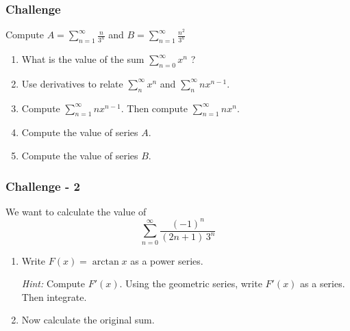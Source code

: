 \documentclass[14pt]{beamer}
\begin{document}
	\begin{frame}[t]
		\frametitle{Challenge}

		Compute \quad $\displaystyle A = \sum_{n=1}^{\infty}\frac{n}{3^{n}}$ \quad
		and \quad $\displaystyle B = \sum_{n=1}^{\infty}\frac{n^{2}}{3^{n}}$

		\hrulefill

		\begin{enumerate}
			\item What is the value of the sum $\displaystyle \sum_{n=0}^{\infty}x^{n}$
				?

			\item Use derivatives to relate $\displaystyle \sum_{n}^{\infty}x^{n}$ and
				$\displaystyle \sum_{n}^{\infty}nx^{n-1}$.

			\item Compute $\displaystyle \sum_{n=1}^{\infty}n x^{n-1}$. \quad Then
				compute $\displaystyle \sum_{n=1}^{\infty}n x^{n}$.

			\item Compute the value of series $A$.

			\item Compute the value of series $B$.
		\end{enumerate}
	\end{frame}

	\begin{frame}[t]
		\frametitle{Challenge - 2}

		We want to calculate the value of
		\[
			\sum_{n=0}^{\infty}\frac{(-1)^{n}}{(2n+1) \, 3^{n}}
		\]

		\hrulefill

		\begin{enumerate}
			\item Write $\displaystyle F(x) = \arctan x$ as a power series.
				\vspace{.5cm}

				\emph{Hint:} Compute $\displaystyle F'(x)$. Using the geometric series,
				write $\displaystyle F'(x)$ as a series. Then integrate.
				\vspace{.5cm}

			\item Now calculate the original sum.
		\end{enumerate}
	\end{frame}
\end{document}

